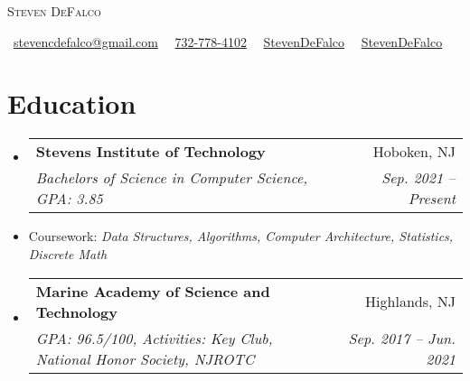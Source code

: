 \documentclass[letterpaper,11pt]{article}
\makeatletter
\newcommand{\email}[1]{\faEnvelope\ \href{mailto:#1}{#1}}
\newcommand{\phone}[1]{\faPhone\ \href{tel:#1}{#1}}
\newcommand{\linkedin}[2][]{\faLinkedin\ \href{#2}{#1}}
\newcommand{\github}[2][]{\faGithub\ \href{#2}{#1}}
\newcommand{\name}[1]{ \centerline{\Huge\scshape{#1}} }
\newcommand{\resumeSubheading}[4]{
  \vspace{-1pt}\item
    \begin{tabular*}{0.97\textwidth}{l@{\extracolsep{\fill}}r}
      \textbf{#1} & #2 \\
      \textit{\small#3} & \textit{\small #4} \\
    \end{tabular*}\vspace{-5pt}
}
\makeatother
\begin{document}
\name{Steven DeFalco}
\begin{center}
    \email{stevencdefalco@gmail.com} \textperiodcentered\ 
    \phone{732-778-4102} \textperiodcentered\ 
    \linkedin[StevenDeFalco]{https://www.linkedin.com/in/stevendefalco/} \textperiodcentered\ 
    \github[StevenDeFalco]{https://github.com/StevenDeFalco}    
\end{center}


\section{Education}
  \begin{itemize}[leftmargin=*]
    \resumeSubheading
      {Stevens Institute of Technology}{Hoboken, NJ}
      {Bachelors of Science in Computer Science,  GPA: 3.85}{Sep. 2021 -- Present}
    \item[] \small Coursework: \textit{Data Structures, Algorithms, Computer Architecture, Statistics, Discrete Math}
    \resumeSubheading
      {Marine Academy of Science and Technology}{Highlands, NJ}
      {GPA: 96.5/100, Activities: Key Club, National Honor Society, NJROTC}{Sep. 2017 -- Jun. 2021}
  \end{itemize}


\end{document}
